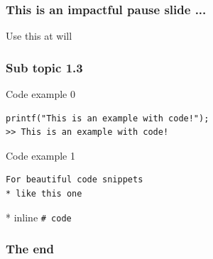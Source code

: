 \documentclass[aspectratio=169]{beamer}
\begin{document}
\begin{frame}
\frametitle{This is an impactful pause slide ...}

Use this at will
\end{frame}

\begin{frame}[fragile]
\frametitle{Sub topic 1.3}

Code example 0

\begin{lstlisting}
printf("This is an example with code!");
>> This is an example with code!
\end{lstlisting}

Code example 1
\begin{verbatim}
For beautiful code snippets
* like this one
\end{verbatim}

* inline \tt{\# code}
\end{frame}

\begin{frame}
\frametitle{The end}
\end{frame}

\frame[plain]{\titlepage}
\end{document}
